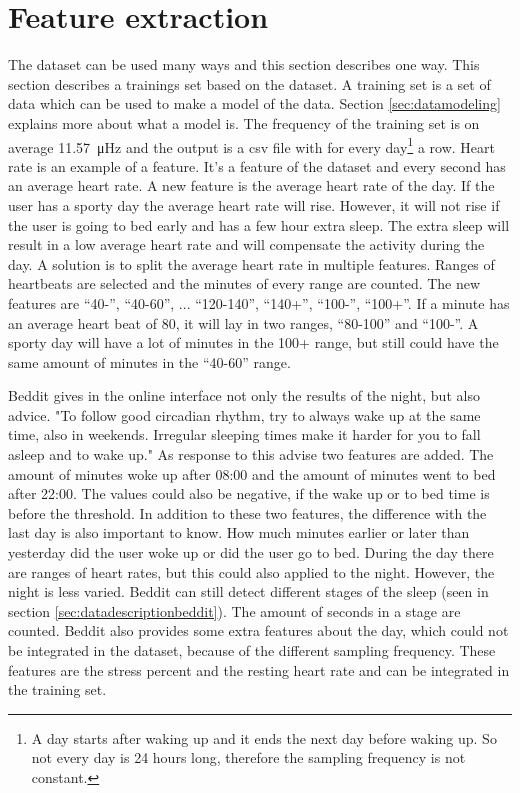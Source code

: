 	\section{Feature extraction}
		\label{sec:feature}
				The dataset can be used many ways and this section describes one way. This section describes a trainings set based on the dataset. A training set is a set of data which can be used to make a model of the data. Section \ref{sec:datamodeling} explains more about what a model is. The frequency of the training set is on average \SI{11.57}{\micro\hertz} and the output is a csv file with for every day\footnote{A day starts after waking up and it ends the next day before waking up. So not every day is 24 hours long, therefore the sampling frequency is not constant.} a row. Heart rate is an example of a feature. It's a feature of the dataset and every second has an average heart rate. A new feature is the average heart rate of the day. If the user has a sporty day the average heart rate will rise. However, it will not rise if the user is going to bed early and has a few hour extra sleep. The extra sleep will result in a low average heart rate and will compensate the activity during the day. A solution is to split the average heart rate in multiple features. Ranges of heartbeats are selected and the minutes of every range are counted. The new features are ``40-'', ``40-60'', ... ``120-140'', ``140+'', ``100-'', ``100+''. If a minute has an average heart beat of 80, it will lay in two ranges, ``80-100'' and ``100-''. A sporty day will have a lot of minutes in the 100+ range, but still could have the same amount of minutes in the ``40-60'' range. 

			Beddit gives in the online interface not only the results of the night, but also advice. "To follow good circadian rhythm, try to always wake up at the same time, also in weekends. Irregular sleeping times make it harder for you to fall asleep and to wake up." As response to this advise two features are added. The amount of minutes woke up after 08:00 and the amount of minutes went to bed after 22:00. The values could also be negative, if the wake up or to bed time is before the threshold. In addition to these two features, the difference with the last day is also important to know. How much minutes earlier or later than yesterday did the user woke up or did the user go to bed. 
			During the day there are ranges of heart rates, but this could also applied to the night. However, the night is less varied. Beddit can still detect different stages of the sleep (seen in section \ref{sec:datadescriptionbeddit}). The amount of seconds in a stage are counted.
			 Beddit also provides some extra features about the day, which could not be integrated in the dataset, because of the different sampling frequency. These features are the stress percent and the resting heart rate and can be integrated in the training set.
				
